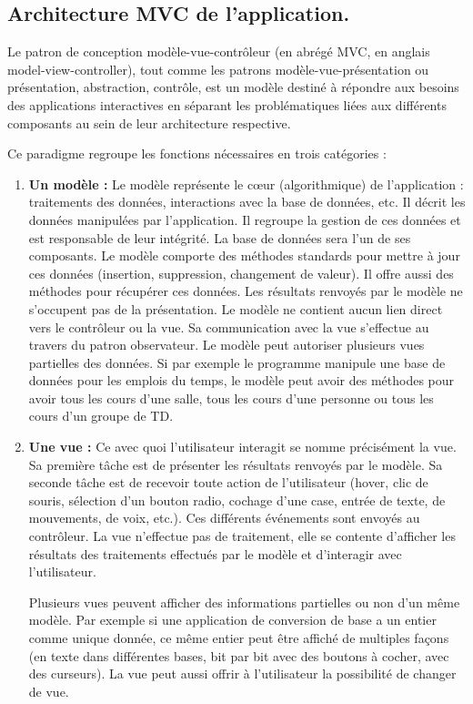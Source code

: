 \subsection{Architecture MVC de l'application.}

Le patron de conception modèle-vue-contrôleur (en abrégé MVC, en anglais model-view-controller), tout comme les patrons modèle-vue-présentation ou présentation, abstraction, contrôle, est un modèle destiné à répondre aux besoins des applications interactives en séparant les problématiques liées aux différents composants au sein de leur architecture respective. 

Ce paradigme regroupe les fonctions nécessaires en trois catégories :

\begin{enumerate}
	\item  \textbf{Un modèle :}
	Le modèle représente le cœur (algorithmique) de l’application : traitements des données, interactions avec la base de données, etc. Il décrit les données manipulées par l’application. Il regroupe la gestion de ces données et est responsable de leur intégrité. La base de données sera l’un de ses composants. Le modèle comporte des méthodes standards pour mettre à jour ces données (insertion, suppression, changement de valeur). Il offre aussi des méthodes pour récupérer ces données. Les résultats renvoyés par le modèle ne s’occupent pas de la présentation. Le modèle ne contient aucun lien direct vers le contrôleur ou la vue. Sa communication avec la vue s’effectue au travers du patron observateur. Le modèle peut autoriser plusieurs vues partielles des données. Si par exemple le programme manipule une base de données pour les emplois du temps, le modèle peut avoir des méthodes pour avoir tous les cours d’une salle, tous les cours d’une personne ou tous les cours d’un groupe de TD.
	\item  \textbf{Une vue :}
	Ce avec quoi l’utilisateur interagit se nomme précisément la vue. Sa première tâche est de présenter les résultats renvoyés par le modèle. Sa seconde tâche est de recevoir toute action de l’utilisateur (hover, clic de souris, sélection d’un bouton radio, cochage d’une case, entrée de texte, de mouvements, de voix, etc.). Ces différents événements sont envoyés au contrôleur. La vue n’effectue pas de traitement, elle se contente d’afficher les résultats des traitements effectués par le modèle et d’interagir avec l’utilisateur. 
	
Plusieurs vues peuvent afficher des informations partielles ou non d’un même modèle. Par exemple si une application de conversion de base a un entier comme unique donnée, ce même entier peut être affiché de multiples façons (en texte dans différentes bases, bit par bit avec des boutons à cocher, avec des curseurs). La vue peut aussi offrir à l’utilisateur la possibilité de changer de vue. 


\end{enumerate}
